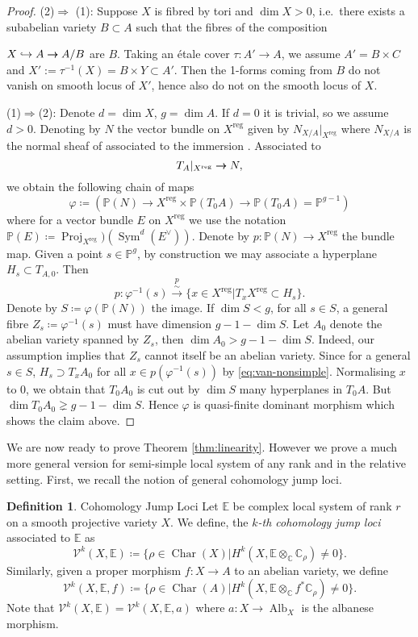 \documentclass[12pt,reqno]{amsart}
\theoremstyle{question}
\theoremstyle{definition}
\newtheorem{definition}[theorem]{Definition}
\theoremstyle{remark}
\theoremstyle{cited}
\theoremstyle{citeddef}
\DeclareMathOperator{\reg}{reg}                  %
\DeclareMathOperator{\Alb}{Alb}
\DeclareMathOperator{\Char}{Char}
\newcommand\sV{{\mathcal V}}
\newcommand{\bbC}{\mathbb{C}}
\newcommand{\bbE}{\mathbb{E}}
\newcommand{\bbP}{\mathbb{P}}
\newcommand{\into}{\hookrightarrow}
\newcommand{\onto}{\rightarrow\hspace*{-.14in}\rightarrow}
\DeclareMathOperator{\Proj}{Proj}
\DeclareMathOperator{\Sym}{Sym}
\begin{document}
\begin{proof}\label{proof:van-nonsimple} (2)$\Rightarrow$ (1): Suppose $X$ is fibred by tori and $\dim X>0$, i.e.\ there exists a subabelian variety $B\subset A$ such that the fibres of the composition 

$X\into A \onto A/B$ are $B$. Taking an \'etale cover $\tau: A'\to A$, we assume $A'=B\times C$ and $X':=\tau^{-1}(X)=B\times Y\subset A'$. Then the 1-forms coming from $B$ do not vanish on smooth locus of $X'$, hence also do not on the smooth locus of $X$. 

(1)$\Rightarrow$(2): Denote $d=\dim X$, $g=\dim A$. If $d=0$ it is trivial, so we assume $d>0$. Denoting by $N$ the
vector bundle on $X^{\reg}$ given by $N_{X/A}|_{X^{\reg}}$ where $N_{X/A}$ is the normal sheaf of associated to the immersion
 \cite[\href{https://stacks.math.columbia.edu/tag/01R1}{Tag 01R1}]{stacks-project}. Associated to \[T_A|_{X^{\reg}}\onto N,\]
we obtain the following chain of maps
\[\varphi\coloneqq (\bbP(N) \to 	X^{\reg}\times \bbP(T_0{A}) \to \bbP(T_0A)=\bbP^{g-1})\]
where for a vector bundle $E$ on $X^{\reg}$ we use the notation $\bbP(E) \coloneqq \Proj_{X^{\reg}})(\Sym^d(E^{\vee}))$.
Denote by $p\colon \bbP(N)\to X^{\reg}$ the bundle map. Given
a point $s\in \bbP^g$, by construction we may associate a hyperplane $H_s\subset T_{A,0}$. Then
\begin{equation}
p\colon \varphi^{-1}(s) \overset{p}{\xrightarrow{\sim}}  \{x\in X^{\reg}| T_xX^{\reg} \subset H_s\}.
\label{eq:van-nonsimple}
\end{equation}
Denote by $S\coloneqq \varphi(\bbP(N))$ the image. If $\dim S<g$, for all $s\in S$, a general
 fibre $Z_s \coloneqq \varphi^{-1}(s)$
must have dimension $g - 1 - \dim S$. Let $A_0$ denote the abelian variety spanned by $Z_s$, then $\dim A_0 > g- 1 - \dim S$. Indeed,
our assumption implies that $Z_s$ cannot itself be an abelian variety. Since for a general $s\in S$, $H_s \supset T_xA_0$
for all $x\in p(\varphi^{-1}(s))$ by \eqref{eq:van-nonsimple}. Normalising $x$ to $0$, we obtain that $T_0A_0$
is cut out by $\dim S$ many hyperplanes in $T_0A$. But $\dim T_0A_0 \gneq g -1 - \dim S$. Hence $\varphi$ is quasi-finite
dominant morphism which shows the claim above.
\end{proof}




We are now ready to prove Theorem \ref{thm:linearity}. However we prove a much more general version for semi-simple local system
of any rank and in the relative setting. First, we recall the notion of general cohomology jump loci.
\begin{definition}{Cohomology Jump Loci}
Let $\bbE$ be complex local system of rank $r$ on a smooth projective variety $X$. We define, the \textsl{$k$-th cohomology jump loci}
associated to $\bbE$ as
\[\sV^k(X, \bbE) \coloneqq \{\rho\in \Char(X)| H^k(X, \bbE\otimes_{\bbC}\bbC_{\rho})\neq 0\}.\]
Similarly, given a proper morphism $f\colon X\to A$ to an abelian variety, we define 
\[\sV^k(X, \bbE, f)\coloneqq \{\rho\in \Char(A)| H^k(X, \bbE\otimes_{\bbC}f^*\bbC_{\rho})\neq 0\}.\]
Note that $\sV^k(X, \bbE) = \sV^k(X,\bbE, a)$ where $a\colon X\to \Alb_X$ is the albanese morphism.
\end{definition}
\end{document}
